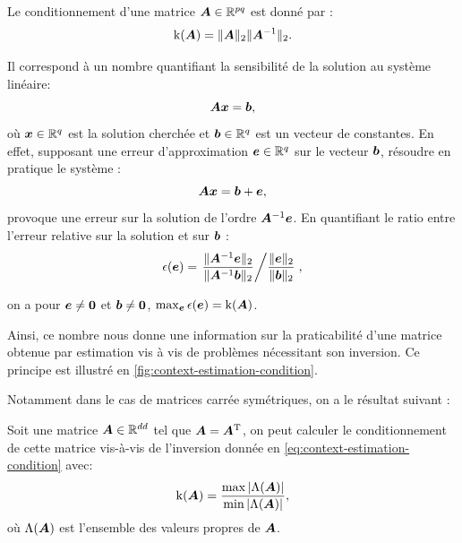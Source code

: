   \begin{definition}
    Le conditionnement d'une matrice $\boldsymbol{A}\in\mathbb{R}^{pq}$  est donné par :
    \begin{equation}
      \operatorname{k}(\boldsymbol{A}) = \|\boldsymbol{A}\|_2\|\boldsymbol{A}^{-1}\|_2.
      \label{eq:context-estimation-condition}
    \end{equation}
    
  \end{definition}

  \begin{remark}
Il correspond à un nombre quantifiant la sensibilité de la solution au système linéaire:
$$
    \boldsymbol{A}\boldsymbol{x} = \boldsymbol{b},
$$
    où $\boldsymbol{x}\in\mathbb{R}^q$ est la solution cherchée et $\boldsymbol{b}\in\mathbb{R}^q$ est un vecteur de constantes. En effet, supposant une erreur d'approximation $\boldsymbol{e}\in\mathbb{R}^q$ sur le vecteur $\boldsymbol{b}$, résoudre en pratique le système :
  $$
      \boldsymbol{A}\boldsymbol{x} = \boldsymbol{b}+\boldsymbol{e},
  $$
    provoque une erreur sur la solution de l'ordre $\boldsymbol{A}^{-1}\boldsymbol{e}$. En quantifiant le ratio entre l'erreur relative sur la solution et sur $\boldsymbol{b}$ :
    $$
     \epsilon(\boldsymbol{e}) =  \left. \frac{\|\boldsymbol{A}^{-1}\boldsymbol{e}\|_2}{\| \boldsymbol{A}^{-1}\boldsymbol{b}\|_2} \displaystyle \middle/ \frac{\|\boldsymbol{e}\|_2}{\| \boldsymbol{b}\|_2} \right. ,
    $$

    on a pour $\boldsymbol{e}\neq \boldsymbol{0}$ et $\boldsymbol{b}\neq\boldsymbol{0}$, $\max_{\boldsymbol{e}}\epsilon(\boldsymbol{e})=\operatorname{k}(\boldsymbol{A})$.

    Ainsi, ce nombre nous donne une information sur la praticabilité d'une matrice obtenue par estimation vis à vis de problèmes nécessitant son inversion. Ce principe est illustré en \cref{fig:context-estimation-condition}.
  \end{remark}

Notamment dans le cas de matrices carrée symétriques, on a le résultat suivant :

\begin{proposition}
  Soit une matrice $\boldsymbol{A}\in\mathbb{R}^{dd}$ tel que $\boldsymbol{A}=\boldsymbol{A}^{\mathrm{T}}$, on peut calculer le conditionnement de cette matrice vis-à-vis de l'inversion donnée en \cref{eq:context-estimation-condition} avec:
    \begin{equation}
      \operatorname{k}(\boldsymbol{A}) = \frac{\max |\Lambda(\boldsymbol{A})|}{\min |\Lambda(\boldsymbol{A})|},
      \label{eq:context-estimation-conditionspd}
    \end{equation}
  où $\Lambda(\boldsymbol{A})$ est l'ensemble des valeurs propres de $\boldsymbol{A}$.
\end{proposition}




